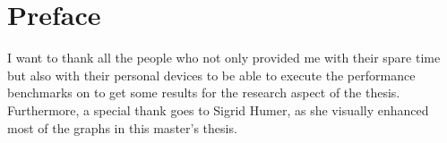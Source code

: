 \chapter{Preface}

I want to thank all the people who not only provided me with their spare time but also with their personal devices to be able to execute the performance benchmarks on to get some results for the research aspect of the thesis. Furthermore, a special thank goes to Sigrid Humer, as she visually enhanced most of the graphs in this master's thesis.






